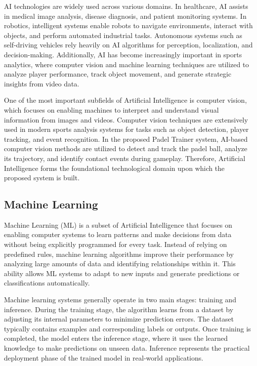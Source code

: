 AI technologies are widely used across various domains. In healthcare, AI assists in medical image analysis, disease diagnosis, and patient monitoring systems. In robotics, intelligent systems enable robots to navigate environments, interact with objects, and perform automated industrial tasks. Autonomous systems such as self-driving vehicles rely heavily on AI algorithms for perception, localization, and decision-making. Additionally, AI has become increasingly important in sports analytics, where computer vision and machine learning techniques are utilized to analyze player performance, track object movement, and generate strategic insights from video data.

One of the most important subfields of Artificial Intelligence is computer vision, which focuses on enabling machines to interpret and understand visual information from images and videos. Computer vision techniques are extensively used in modern sports analysis systems for tasks such as object detection, player tracking, and event recognition. In the proposed Padel Trainer system, AI-based computer vision methods are utilized to detect and track the padel ball, analyze its trajectory, and identify contact events during gameplay. Therefore, Artificial Intelligence forms the foundational technological domain upon which the proposed system is built.

\subsection{Machine Learning}

Machine Learning (ML) is a subset of Artificial Intelligence that focuses on enabling computer systems to learn patterns and make decisions from data without being explicitly programmed for every task. Instead of relying on predefined rules, machine learning algorithms improve their performance by analyzing large amounts of data and identifying relationships within it. This ability allows ML systems to adapt to new inputs and generate predictions or classifications automatically.

Machine learning systems generally operate in two main stages: training and inference. During the training stage, the algorithm learns from a dataset by adjusting its internal parameters to minimize prediction errors. The dataset typically contains examples and corresponding labels or outputs. Once training is completed, the model enters the inference stage, where it uses the learned knowledge to make predictions on unseen data. Inference represents the practical deployment phase of the trained model in real-world applications.

